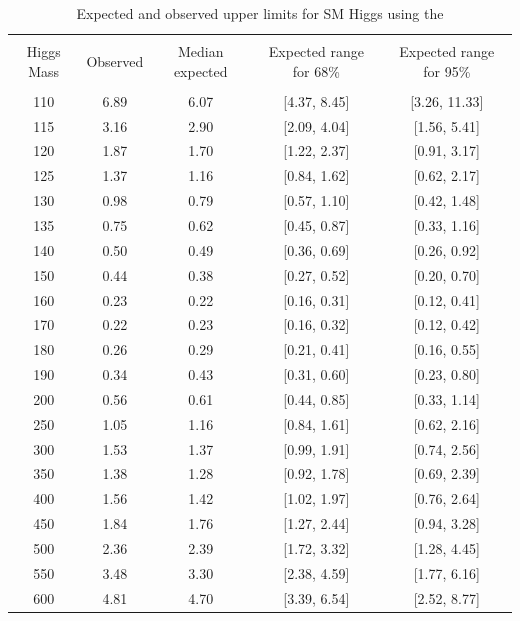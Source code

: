 \begin{table}[hbp!]
\begin{center}
\begin{tabular}{c c c c c}
\hline
\vspace{-3mm} && \\
 Higgs Mass & Observed  & Median expected & Expected range for 68\% & Expected range for 95\%   \\
\hline
\vspace{-3mm} && \\
110 & 6.89 & 6.07 & [4.37, 8.45] & [3.26, 11.33] \\
115 & 3.16 & 2.90 & [2.09, 4.04] & [1.56, 5.41] \\
120 & 1.87 & 1.70 & [1.22, 2.37] & [0.91, 3.17] \\
125 & 1.37 & 1.16 & [0.84, 1.62] & [0.62, 2.17] \\
130 & 0.98 & 0.79 & [0.57, 1.10] & [0.42, 1.48] \\
135 & 0.75 & 0.62 & [0.45, 0.87] & [0.33, 1.16] \\
140 & 0.50 & 0.49 & [0.36, 0.69] & [0.26, 0.92] \\
150 & 0.44 & 0.38 & [0.27, 0.52] & [0.20, 0.70] \\
160 & 0.23 & 0.22 & [0.16, 0.31] & [0.12, 0.41] \\
170 & 0.22 & 0.23 & [0.16, 0.32] & [0.12, 0.42] \\
180 & 0.26 & 0.29 & [0.21, 0.41] & [0.16, 0.55] \\
190 & 0.34 & 0.43 & [0.31, 0.60] & [0.23, 0.80] \\
200 & 0.56 & 0.61 & [0.44, 0.85] & [0.33, 1.14] \\
250 & 1.05 & 1.16 & [0.84, 1.61] & [0.62, 2.16] \\
300 & 1.53 & 1.37 & [0.99, 1.91] & [0.74, 2.56] \\
350 & 1.38 & 1.28 & [0.92, 1.78] & [0.69, 2.39] \\
400 & 1.56 & 1.42 & [1.02, 1.97] & [0.76, 2.64] \\
450 & 1.84 & 1.76 & [1.27, 2.44] & [0.94, 3.28] \\
500 & 2.36 & 2.39 & [1.72, 3.32] & [1.28, 4.45] \\
550 & 3.48 & 3.30 & [2.38, 4.59] & [1.77, 6.16] \\
600 & 4.81 & 4.70 & [3.39, 6.54] & [2.52, 8.77] \\
\hline
\end{tabular}
\caption{Expected and observed upper limits for SM Higgs using the
}
\end{center}
\end{table}
